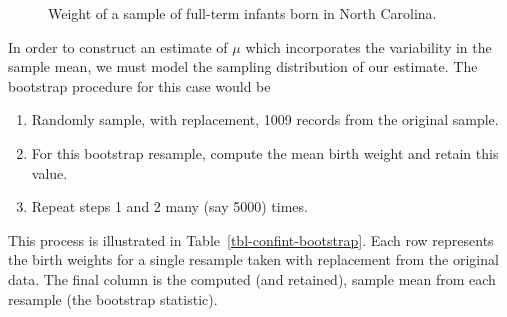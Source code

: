 \documentclass[
  letterpaper,
  DIV=11,
  numbers=noendperiod]{scrreprt}
\providecommand{\tightlist}{%
  \setlength{\itemsep}{0pt}\setlength{\parskip}{0pt}}\usepackage{longtable,booktabs,array}
\theoremstyle{plain}
\theoremstyle{definition}
\theoremstyle{definition}
\theoremstyle{remark}
\begin{document}
\begin{figure}


\caption{\label{fig-confint-histogram}Weight of a sample of full-term
infants born in North Carolina.}

\end{figure}%

In order to construct an estimate of \(\mu\) which incorporates the
variability in the sample mean, we must model the sampling distribution
of our estimate. The bootstrap procedure for this case would be

\begin{enumerate}
\def\labelenumi{\arabic{enumi}.}
\tightlist
\item
  Randomly sample, with replacement, 1009 records from the original
  sample.
\item
  For this bootstrap resample, compute the mean birth weight and retain
  this value.
\item
  Repeat steps 1 and 2 many (say 5000) times.
\end{enumerate}

This process is illustrated in Table~\ref{tbl-confint-bootstrap}. Each
row represents the birth weights for a single resample taken with
replacement from the original data. The final column is the computed
(and retained), sample mean from each resample (the bootstrap
statistic).
\end{document}
